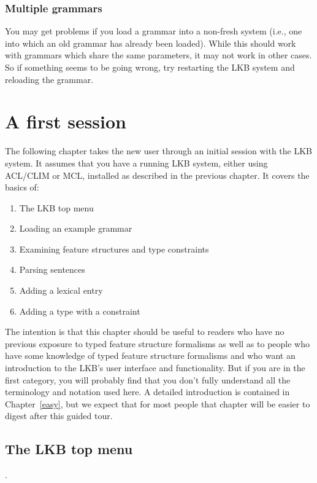 \documentclass[12pt]{report}
\begin{document}
\subsection{Multiple grammars}

You may get problems if you load a grammar into a non-fresh system
(i.e., one into which an old grammar has already been loaded).
While this should work with grammars which share the same parameters,
it may not work in other cases.  So if something seems to be
going wrong, try restarting the LKB system and reloading the grammar.

\chapter{A first session}
\label{firstsession}
The following chapter takes the new user through an initial session
with the LKB system.  It assumes that you have a running LKB system,
either using ACL/CLIM or MCL,
installed as described in the previous chapter.
It covers the basics of:
\begin{enumerate}
\item The LKB top menu
\item Loading an example grammar
\item Examining feature structures and type constraints
\item Parsing sentences
\item Adding a lexical entry
\item Adding a type with a constraint
\end{enumerate}
The intention is that this chapter should be useful
to readers who have no previous exposure to
typed feature structure formalisms as well as
to people who have some knowledge of typed feature structure
formalisms and who want an introduction to the LKB's user
interface and functionality.  But if you are in the first
category, you will probably find that you don't fully understand all the
terminology and notation used here.  A detailed introduction
is contained in Chapter~\ref{easy}, but we expect that for most people
that chapter will be easier to digest after this guided tour.

\section{The LKB top menu}
\label{topmenu}.
\end{document}
